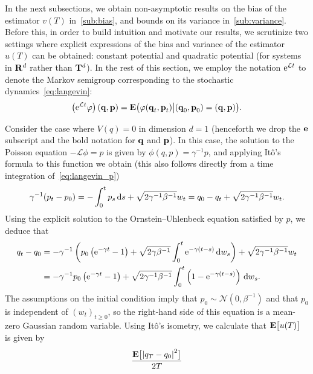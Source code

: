 \documentclass[11pt,a4paper]{article}
\begin{document}
In the next subsections,
we obtain non-asymptotic results on the bias of the estimator $v(T)$ in~\cref{sub:bias},
and bounds on its variance in~\cref{sub:variance}.
Before this,
in order to build intuition and motivate our results,
we scrutinize two settings where
explicit expressions of the bias and variance of the estimator $u(T)$ can be obtained:
constant potential and quadratic potential (for systems in $\mathbf R^d$ rather than $\mathbf T^d$).
In the rest of this section,
we employ the notation $\mathrm{e}^{\mathcal L t}$ to denote the Markov semigroup corresponding to the stochastic dynamics~\eqref{eq:langevin}:
\[
    \left(\mathrm{e}^{\mathcal L t} \varphi\right) (\boldsymbol{\mathbf q}, \boldsymbol{\mathbf p}) = \mathbf{E} \bigl(\varphi(\boldsymbol{\mathbf q}_t, \boldsymbol{\mathbf p}_t) \big| (\boldsymbol{\mathbf q}_0, \boldsymbol{\mathbf p}_0) = (\boldsymbol{\mathbf q}, \boldsymbol{\mathbf p})\bigr).
\]
\begin{example}
    \label{example:constant}
    Consider the case where $V(q) = 0$ in dimension $d = 1$
    (henceforth we drop the $\boldsymbol{\mathbf e}$ subscript and the bold notation for $\boldsymbol{\mathbf q}$ and $\boldsymbol{\mathbf p}$).
    In this case, the solution to the Poisson equation $- \mathcal L \phi = p$ is given by $\phi(q, p) = \gamma^{-1} p$,
    and applying Itô's formula to this function we obtain
    (this also follows directly from a time integration of~\eqref{eq:langevin_p})
    \[
        \gamma^{-1}(p_t - p_0) = - \int_{0}^{t} p_s \, \mathrm d s + \sqrt{2 \gamma^{-1} \beta^{-1}} w_t
        = q_0 - q_t + \sqrt{2 \gamma^{-1} \beta^{-1}} w_t.
    \]
    Using the explicit solution to the Ornstein--Uhlenbeck equation satisfied by $p$,
    we deduce that
    \begin{align*}
        q_t - q_0
        &= - \gamma^{-1} \left( p_0 \left(\mathrm{e}^{-\gamma t} - 1\right) + \sqrt{2 \gamma \beta^{-1}}\int_{0}^{t} \mathrm{e}^{-\gamma (t - s)} \, \mathrm d w_s \right)
        + \sqrt{2 \gamma^{-1} \beta^{-1}} w_t \\
        &=  - \gamma^{-1} p_0 \left(\mathrm{e}^{-\gamma t} - 1\right) + \sqrt{2 \gamma^{-1} \beta^{-1}}\int_{0}^{t} \left(1 - \mathrm{e}^{-\gamma (t - s)}\right) \, \mathrm d w_s.
    \end{align*}
    The assumptions on the initial condition imply that $p_0 \sim \mathcal N(0, \beta^{-1})$ and that $p_0$ is independent of $(w_t)_{t \geq 0}$,
    so the right-hand side of this equation is a mean-zero Gaussian random variable.
    Using It\^o's isometry, we calculate that $\mathbf{E} \bigl[ u(T) \bigr]$ is given by
    \begin{align*}
        \frac{\expect \bigl[\abs{q_T - q_0}^2\bigr]}{2T}

\end{align*}
\end{example}
\end{document}
